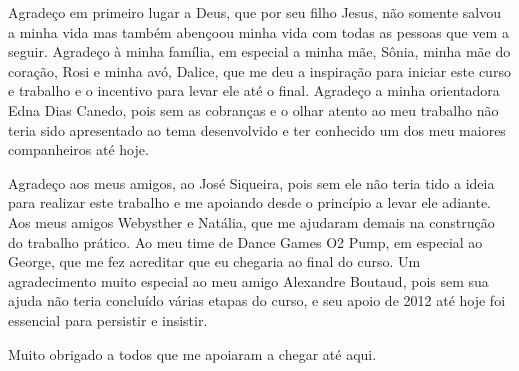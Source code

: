 Agradeço em primeiro lugar a Deus, que por seu filho Jesus, não somente salvou a minha vida mas também abençoou minha vida com todas as pessoas que vem a seguir. Agradeço à minha família, em especial a minha mãe, Sônia, minha mãe do coração, Rosi e minha avó, Dalice, que me deu a inspiração para iniciar este curso e trabalho e o incentivo para levar ele até o final. Agradeço a minha orientadora Edna Dias Canedo, pois sem as cobranças e o olhar atento ao meu trabalho não teria sido apresentado ao tema desenvolvido e ter conhecido um dos meu maiores companheiros até hoje. 

Agradeço aos meus amigos, ao José Siqueira, pois sem ele não teria tido a ideia para realizar este trabalho e me apoiando desde o princípio a levar ele adiante. Aos meus amigos Webysther e Natália, que me ajudaram demais na construção do trabalho prático. Ao meu time de Dance Games O2 Pump, em especial ao George, que me fez acreditar que eu chegaria ao final do curso. Um agradecimento muito especial ao meu amigo Alexandre Boutaud, pois sem sua ajuda não teria concluído várias etapas do curso, e seu apoio de 2012 até hoje foi essencial para persistir e insistir.

Muito obrigado a todos que me apoiaram a chegar até aqui.

